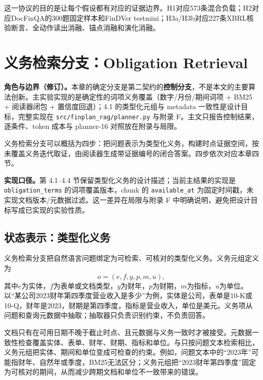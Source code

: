 这一协议的目的是让每个假设都有对应的证据边界。H1对应573条混合负载；H2对应DocFinQA的300题固定样本和FinDVer testmini；H3a/H3b对应227条XBRL核验断言、全动作读出消融、锚点消融和演化消融。

\chapter{义务检索分支：Obligation Retrieval}

\begin{revbox}

\noindent\textbf{角色与边界（修订）。}本章的确定分支是第二契约的\textbf{控制分支}，不是本文的主要算法创新。主实验实现的是确定性的词项义务覆盖（数字/月份/期间词项 + BM25 + 阅读器闭包 + 置信度回退）；4.1 的类型化元组与 metadata 一致性是设计目标，完整实现在 \texttt{src/finplan\_rag/planner.py} 与附录 F。主文只报告控制结果，逐条件、token 成本与 planner-16 对照放在附录与局限。
\end{revbox}
\label{ch:determinate}

义务检索分支可以概括为四步：把问题表示为类型化义务，构建时点证据空间，按未覆盖义务迭代取证，由阅读器生成带证据编号的闭合答案。四步依次对应本章四节。

\begin{revbox}

\noindent\textbf{实现口径。}第 4.1--4.4 节保留类型化义务的设计描述；当前主结果的实现是 \texttt{obligation\_terms} 的词项覆盖版本，chunk 的 \texttt{available\_at} 为固定时间戳，未实现文档版本/元数据过滤。这一差异在局限与附录 F 中明确说明，避免把设计目标写成已实现的实验性质。
\end{revbox}

\section{状态表示：类型化义务}

义务检索分支把自然语言问题绑定为可检索、可核对的类型化义务。义务元组定义为
\begin{equation}
o=(e,f,y,p,m,u),
\end{equation}
其中$e$为实体，$f$为表单或文档类型，$y$为财年，$p$为财期，$m$为指标，$u$为单位。以“某公司2023财年第四季度营业收入是多少”为例，实体是公司，表单是10-K或10-Q，财年是2023，财期是第四季度，指标是营业收入，单位是美元。义务项从问题和查询元数据中抽取；抽取器只负责识别约束，不负责回答。

文档只有在可用日期不晚于截止时点、且元数据与义务一致时才被接受。元数据一致性检查覆盖实体、表单、财年、财期、指标和单位。与只按问题文本检索相比，义务元组把实体、期间和单位变成可检查的约束。例如，问题文本中的“2023年”可能指财年、自然年或季度，BM25无法区分；义务元组把“2023财年第四季度”固定为可核对的期间，从而减少跨期文档和单位不一致带来的错误。

